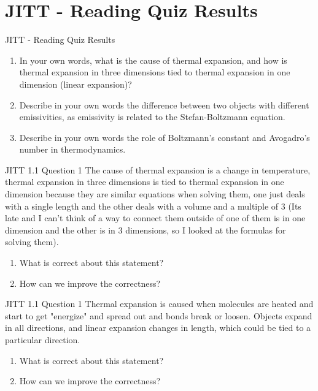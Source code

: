 \documentclass{beamer}
\begin{document}
\section{JITT - Reading Quiz Results}

\begin{frame}{JITT - Reading Quiz Results}
\begin{enumerate}
\item In your own words, what is the cause of thermal expansion, and how is thermal expansion in three dimensions tied to thermal expansion in one dimension (linear expansion)?
\item Describe in your own words the difference between two objects with different emissivities, as emissivity is related to the Stefan-Boltzmann equation.
\item Describe in your own words the role of Boltzmann's constant and Avogadro's number in thermodynamics.
\end{enumerate}
\end{frame}

\begin{frame}{JITT 1.1 Question 1}
\small
The cause of thermal expansion is a change in temperature, thermal expansion in three dimensions is tied to thermal expansion in one dimension because they are similar equations when solving them, one just deals with a single length and the other deals with a volume and a multiple of 3 (Its late and I can’t think of a way to connect them outside of one of them is in one dimension and the other is in 3 dimensions, so I looked at the formulas for solving them).
\begin{enumerate}
\item What is correct about this statement?
\item How can we improve the correctness?
\end{enumerate}
\end{frame}

\begin{frame}{JITT 1.1 Question 1}
\small
Thermal expansion is caused when molecules are heated and start to get "energize" and spread out and bonds break or loosen. Objects expand in all directions, and linear expansion changes in length, which could be tied to a particular direction. 
\begin{enumerate}
\item What is correct about this statement?
\item How can we improve the correctness?
\end{enumerate}
\end{frame}
\end{document}
